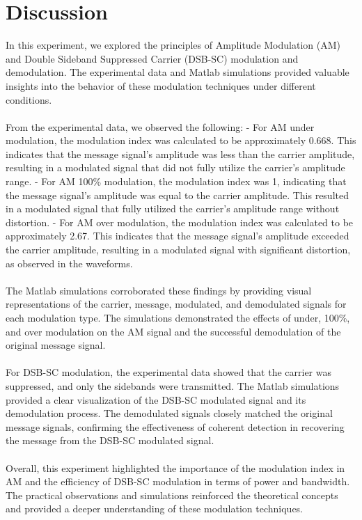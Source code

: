 \documentclass[12pt]{article}
\begin{document}
\section*{Discussion}
In this experiment, we explored the principles of Amplitude Modulation (AM) and Double Sideband Suppressed Carrier (DSB-SC) modulation and demodulation. The experimental data and Matlab simulations provided valuable insights into the behavior of these modulation techniques under different conditions.
\\\\
From the experimental data, we observed the following:
- For AM under modulation, the modulation index was calculated to be approximately 0.668. This indicates that the message signal's amplitude was less than the carrier amplitude, resulting in a modulated signal that did not fully utilize the carrier's amplitude range.
- For AM 100\% modulation, the modulation index was 1, indicating that the message signal's amplitude was equal to the carrier amplitude. This resulted in a modulated signal that fully utilized the carrier's amplitude range without distortion.
- For AM over modulation, the modulation index was calculated to be approximately 2.67. This indicates that the message signal's amplitude exceeded the carrier amplitude, resulting in a modulated signal with significant distortion, as observed in the waveforms.
\\\\
The Matlab simulations corroborated these findings by providing visual representations of the carrier, message, modulated, and demodulated signals for each modulation type. The simulations demonstrated the effects of under, 100\%, and over modulation on the AM signal and the successful demodulation of the original message signal.
\\\\
For DSB-SC modulation, the experimental data showed that the carrier was suppressed, and only the sidebands were transmitted. The Matlab simulations provided a clear visualization of the DSB-SC modulated signal and its demodulation process. The demodulated signals closely matched the original message signals, confirming the effectiveness of coherent detection in recovering the message from the DSB-SC modulated signal.
\\\\
Overall, this experiment highlighted the importance of the modulation index in AM and the efficiency of DSB-SC modulation in terms of power and bandwidth. The practical observations and simulations reinforced the theoretical concepts and provided a deeper understanding of these modulation techniques.
\end{document}
